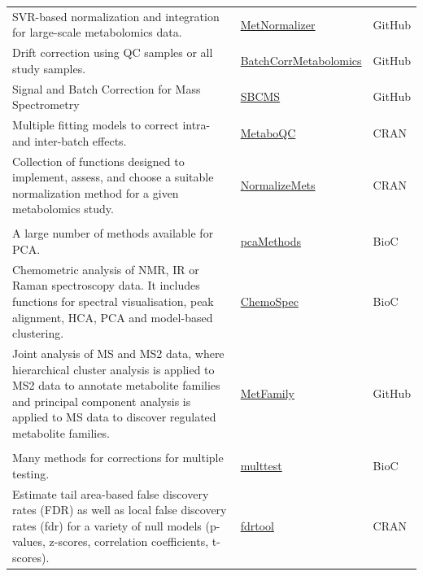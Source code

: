 \documentclass[]{article}
\begin{document}
\begin{longtable}{>{\raggedright\arraybackslash}p{30em}>{\raggedright\arraybackslash}p{10em}>{\raggedright\arraybackslash}p{3em}}
\rowcolor{gray!6}  SVR-based normalization and integration for large-scale metabolomics data. & \href{http://www.metabolomics-shanghai.org/softwaredetail.php?id=39}{MetNormalizer} & GitHub\\
Drift correction using QC samples or all study samples. & \href{https://github.com/rwehrens/BatchCorrMetabolomics}{BatchCorrMetabolomics} & GitHub\\
\rowcolor{gray!6}  Signal and Batch Correction for Mass Spectrometry & \href{https://github.com/computational-metabolomics/sbcms}{SBCMS} & GitHub\\
Multiple fitting models to correct intra- and inter-batch effects. & \href{https://cran.r-project.org/package=MetaboQC}{MetaboQC} & CRAN\\
\rowcolor{gray!6}  Collection of functions designed to implement, assess, and choose a suitable normalization method for a given metabolomics study. & \href{https://cran.r-project.org/package=NormalizeMets}{NormalizeMets} & CRAN\\
\addlinespace[0.3em]
\multicolumn{3}{l}{\textbf{Exploratory Data Analysis}}\\
A large number of methods available for PCA. & \href{http://bioconductor.org/packages/release/bioc/html/pcaMethods.html}{pcaMethods} & BioC\\
\rowcolor{gray!6}  Chemometric analysis of NMR, IR or Raman spectroscopy data. It includes functions for spectral visualisation, peak alignment, HCA, PCA and model-based clustering. & \href{https://cran.r-project.org/package=ChemoSpec}{ChemoSpec} & BioC\\
Joint analysis of MS and MS2 data, where hierarchical cluster analysis is applied to MS2 data to annotate metabolite families and principal component analysis is applied to MS data to discover regulated metabolite families. & \href{https://github.com/ipb-halle/MetFamily}{MetFamily} & GitHub\\
\rowcolor{gray!6}  \addlinespace[0.3em]
\multicolumn{3}{l}{\textbf{Univariate hypothesis testing}}\\
Many methods for corrections for multiple testing. & \href{http://bioconductor.org/packages/release/bioc/html/multtest.html}{multtest} & BioC\\
Estimate tail area-based false discovery rates (FDR) as well as local false discovery rates (fdr) for a variety of null models (p-values, z-scores, correlation coefficients, t-scores). & \href{http://strimmerlab.org/software/fdrtool/}{fdrtool} & CRAN\\

\end{longtable}
\end{document}
